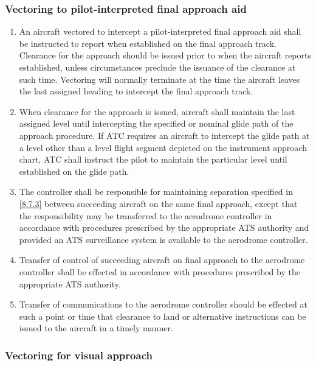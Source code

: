 \subsubsection{Vectoring to pilot-interpreted final approach aid}

\begin{enumerate}
    \item An aircraft vectored to intercept a pilot-interpreted final approach aid shall be instructed to report when established on the final approach track. Clearance for the approach should be issued prior to when the aircraft reports established, unless circumstances preclude the issuance of the clearance at such time. Vectoring will normally terminate at the time the aircraft leaves the last assigned heading to intercept the final approach track.
    \item When clearance for the approach is issued, aircraft shall maintain the last assigned level until intercepting the specified or nominal glide path of the approach procedure. If ATC requires an aircraft to intercept the glide path at a level other than a level flight segment depicted on the instrument approach chart, ATC shall instruct the pilot to maintain the particular level until established on the glide path.
    \item The controller shall be responsible for maintaining separation specified in \ref{8.7.3} between succeeding aircraft on the same final approach, except that the responsibility may be transferred to the aerodrome controller in accordance with procedures prescribed by the appropriate ATS authority and provided an ATS surveillance system is available to the aerodrome controller.
    \item Transfer of control of succeeding aircraft on final approach to the aerodrome controller shall be effected in accordance with procedures prescribed by the appropriate ATS authority.
    \item Transfer of communications to the aerodrome controller should be effected at such a point or time that clearance to land or alternative instructions can be issued to the aircraft in a timely manner.
\end{enumerate}

\subsubsection{Vectoring for visual approach}


